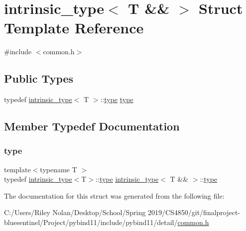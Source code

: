 \hypertarget{structintrinsic__type_3_01_t_01_6_6_01_4}{}\section{intrinsic\+\_\+type$<$ T \&\& $>$ Struct Template Reference}
\label{structintrinsic__type_3_01_t_01_6_6_01_4}


{\ttfamily \#include $<$common.\+h$>$}

\subsection*{Public Types}
\begin{DoxyCompactItemize}
\item 
typedef \mbox{\hyperlink{structintrinsic__type}{intrinsic\+\_\+type}}$<$ T $>$\+::\mbox{\hyperlink{structintrinsic__type_3_01_t_01_6_6_01_4_a75c466ec3acf285f085eb64d8f063510}{type}} \mbox{\hyperlink{structintrinsic__type_3_01_t_01_6_6_01_4_a75c466ec3acf285f085eb64d8f063510}{type}}
\end{DoxyCompactItemize}


\subsection{Member Typedef Documentation}
\mbox{\label{structintrinsic__type_3_01_t_01_6_6_01_4_a75c466ec3acf285f085eb64d8f063510}} 
\subsubsection{\texorpdfstring{type}{type}}
{\footnotesize\ttfamily template$<$typename T $>$ \\
typedef \mbox{\hyperlink{structintrinsic__type}{intrinsic\+\_\+type}}$<$T$>$\+::\mbox{\hyperlink{structintrinsic__type_3_01_t_01_6_6_01_4_a75c466ec3acf285f085eb64d8f063510}{type}} \mbox{\hyperlink{structintrinsic__type}{intrinsic\+\_\+type}}$<$ T \&\& $>$\+::\mbox{\hyperlink{structintrinsic__type_3_01_t_01_6_6_01_4_a75c466ec3acf285f085eb64d8f063510}{type}}}



The documentation for this struct was generated from the following file\+:\begin{DoxyCompactItemize}
\item 
C\+:/\+Users/\+Riley Nolan/\+Desktop/\+School/\+Spring 2019/\+C\+S4850/git/finalproject-\/bluesentinel/\+Project/pybind11/include/pybind11/detail/\mbox{\hyperlink{detail_2common_8h}{common.\+h}}\end{DoxyCompactItemize}
